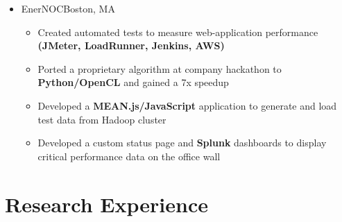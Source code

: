 \documentclass[11pt,letterpaper,sans]{moderncv}
\begin{document}
\begin{itemize}
\item[] {
{EnerNOC}{Boston, MA}{}{\vspace{1pt}}
\vspace{-8pt}	\begin{itemize}
	 \item Created automated tests to measure web-application performance \textbf{(JMeter, LoadRunner, Jenkins, AWS)}
	 \item Ported a proprietary algorithm at company hackathon to \textbf{Python/OpenCL} and gained a 7x speedup
	 \item Developed a \textbf{MEAN.js/JavaScript} application to generate and load test data from Hadoop cluster
	 \item Developed a custom status page and \textbf{Splunk} dashboards to display critical performance data on the office wall
	\end{itemize}
}


\end{itemize}
\vspace{-6pt}



\section{Research Experience}

\vspace{1pt}
\end{document}
